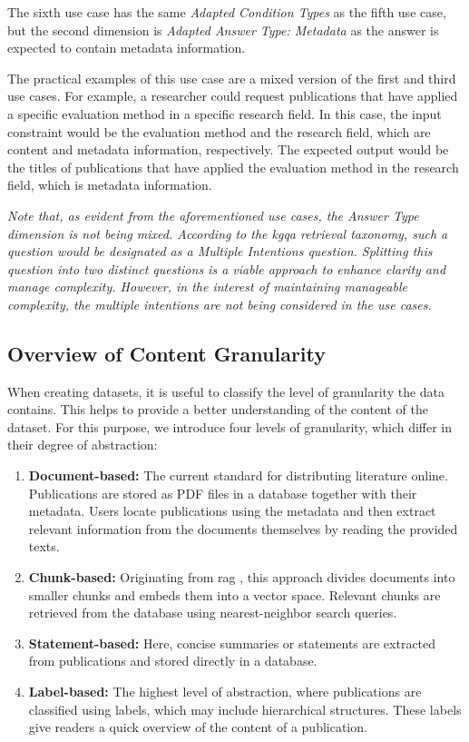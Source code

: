 The sixth use case has the same \emph{Adapted Condition Types} as the fifth use case, but the second dimension is \emph{Adapted Answer Type: Metadata} as the answer is expected to contain metadata information. 

The practical examples of this use case are a mixed version of the first and third use cases. For example, a researcher could request publications that have applied a specific evaluation method in a specific research field. In this case, the input constraint would be the evaluation method and the research field, which are content and metadata information, respectively. The expected output would be the titles of publications that have applied the evaluation method in the research field, which is metadata information.

\textit{Note that, as evident from the aforementioned use cases, the Answer Type dimension is not being mixed. According to the \gls{kgqa} retrieval taxonomy, such a question would be designated as a Multiple Intentions question. Splitting this question into two distinct questions is a viable approach to enhance clarity and manage complexity. However, in the interest of maintaining manageable complexity, the multiple intentions are not being considered in the use cases.}

\subsection{Overview of Content Granularity}
\label{sec:content_granularity}

When creating datasets, it is useful to classify the level of granularity the data contains. This helps to provide a better understanding of the content of the dataset. For this purpose, we introduce four levels of granularity, which differ in their degree of abstraction:

\begin{enumerate} 
    \item \textbf{Document-based:} The current standard for distributing literature online. Publications are stored as PDF files in a database together with their metadata. Users locate publications using the metadata and then extract relevant information from the documents themselves by reading the provided texts. 
    \item \textbf{Chunk-based:} Originating from \gls{rag} \cite{lewis_retrieval-augmented_2021}, this approach divides documents into smaller chunks and embeds them into a vector space. Relevant chunks are retrieved from the database using nearest-neighbor search queries.
    \item \textbf{Statement-based:} Here, concise summaries or statements are extracted from publications and stored directly in a database. 
    \item \textbf{Label-based:} The highest level of abstraction, where publications are classified using labels, which may include hierarchical structures. These labels give readers a quick overview of the content of a publication. 
\end{enumerate}


